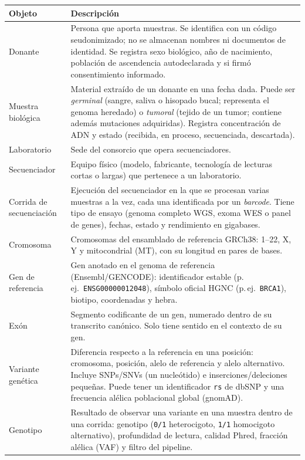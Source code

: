 \documentclass[11pt,a4paper]{article}
\newcommand{\tb}[1]{\texttt{#1}}
\begin{document}
\begin{longtable}{>{\raggedright\arraybackslash}p{3.2cm} >{\raggedright\arraybackslash}p{11.8cm}}
\toprule
\textbf{Objeto} & \textbf{Descripción} \\
\midrule
\endhead
Donante & Persona que aporta muestras. Se identifica con un código seudonimizado; no se almacenan nombres ni documentos de identidad. Se registra sexo biológico, año de nacimiento, población de ascendencia autodeclarada y si firmó consentimiento informado. \\
Muestra biológica & Material extraído de un donante en una fecha dada. Puede ser \emph{germinal} (sangre, saliva o hisopado bucal; representa el genoma heredado) o \emph{tumoral} (tejido de un tumor; contiene además mutaciones adquiridas). Registra concentración de ADN y estado (recibida, en proceso, secuenciada, descartada). \\
Laboratorio & Sede del consorcio que opera secuenciadores. \\
Secuenciador & Equipo físico (modelo, fabricante, tecnología de lecturas cortas o largas) que pertenece a un laboratorio. \\
Corrida de secuenciación & Ejecución del secuenciador en la que se procesan varias muestras a la vez, cada una identificada por un \emph{barcode}. Tiene tipo de ensayo (genoma completo WGS, exoma WES o panel de genes), fechas, estado y rendimiento en gigabases. \\
Cromosoma & Cromosomas del ensamblado de referencia GRCh38: 1--22, X, Y y mitocondrial (MT), con su longitud en pares de bases. \\
Gen de referencia & Gen anotado en el genoma de referencia (Ensembl/GENCODE): identificador estable (p.\,ej.\ \tb{ENSG00000012048}), símbolo oficial HGNC (p.\,ej.\ \tb{BRCA1}), biotipo, coordenadas y hebra. \\
Exón & Segmento codificante de un gen, numerado dentro de su transcrito canónico. Solo tiene sentido en el contexto de su gen. \\
Variante genética & Diferencia respecto a la referencia en una posición: cromosoma, posición, alelo de referencia y alelo alternativo. Incluye SNPs/SNVs (un nucleótido) e inserciones/deleciones pequeñas. Puede tener un identificador \tb{rs} de dbSNP y una frecuencia alélica poblacional global (gnomAD). \\
Genotipo & Resultado de observar una variante en una muestra dentro de una corrida: genotipo (\tb{0/1} heterocigoto, \tb{1/1} homocigoto alternativo), profundidad de lectura, calidad Phred, fracción alélica (VAF) y filtro del pipeline. \\

\end{longtable}
\end{document}
